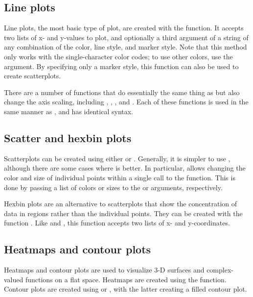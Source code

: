 \subsection*{Line plots}
Line plots, the most basic type of plot, are created with the  function.
It accepts two lists of x- and y-values to plot, and optionally a third argument of a string of any combination of the color, line style, and marker style.
Note that this method only works with the single-character color codes; to use other colors, use the  argument.
By specifying only a marker style, this function can also be used to create scatterplots.

There are a number of functions that do essentially the same thing as  but also change the axis scaling, including , , , and .
Each of these functions is used in the same manner as , and has identical syntax.

\subsection*{Scatter and hexbin plots}
Scatterplots can be created using either  or .
Generally, it is simpler to use , although there are some cases where   is better.
In particular,  allows changing the color and size of individual points within a single call to the function.
This is done by passing a list of colors or sizes to the  or  arguments, respectively.

Hexbin plots are an alternative to scatterplots that show the concentration of data in regions rather than the individual points.
They can be created with the function .
Like  and , this function accepts two lists of x- and y-coordinates.


\subsection*{Heatmaps and contour plots}
Heatmaps and contour plots are used to visualize 3-D surfaces and complex-valued functions on a flat space.
Heatmaps are created using the  function.
Contour plots are created using  or , with the latter creating a filled contour plot.

